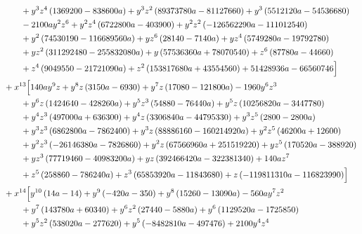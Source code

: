 \begin{align*}
&\qquad + y^{3} z^{4} \left(1369200 - 838600 a\right) + y^{3} z^{2} \left(89373780 a - 81127660\right) + y^{3} \left(5512120 a - 54536680\right)\\
&\qquad - 2100 a y^{2} z^{6} + y^{2} z^{4} \left(6722800 a - 403900\right) + y^{2} z^{2} \left(- 126562290 a - 111012540\right)\\
&\qquad + y^{2} \left(74530190 - 116689560 a\right) + y z^{6} \left(28140 - 7140 a\right) + y z^{4} \left(5749280 a - 19792780\right)\\
&\qquad + y z^{2} \left(311292480 - 255832080 a\right) + y \left(57536360 a + 78070540\right) + z^{6} \left(87780 a - 44660\right)\\
&\qquad + z^{4} \left(9049550 - 21721090 a\right) + z^{2} \left(153817680 a + 43554560\right) + 51428936 a - 66560746\Bigr]\\
&{}+x^{13}\Bigl[140 a y^{9} z + y^{8} z \left(3150 a - 6930\right) + y^{7} z \left(17080 - 121800 a\right) - 1960 y^{6} z^{3}\\
&\qquad + y^{6} z \left(1424640 - 428260 a\right) + y^{5} z^{3} \left(54880 - 76440 a\right) + y^{5} z \left(10256820 a - 3447780\right)\\
&\qquad + y^{4} z^{3} \left(497000 a + 636300\right) + y^{4} z \left(3306840 a - 44795330\right) + y^{3} z^{5} \left(2800 - 2800 a\right)\\
&\qquad + y^{3} z^{3} \left(6862800 a - 7862400\right) + y^{3} z \left(88886160 - 160214920 a\right) + y^{2} z^{5} \left(46200 a + 12600\right)\\
&\qquad + y^{2} z^{3} \left(- 26146380 a - 7826860\right) + y^{2} z \left(67566960 a + 251519220\right) + y z^{5} \left(170520 a - 388920\right)\\
&\qquad + y z^{3} \left(77719460 - 40983200 a\right) + y z \left(392466420 a - 322381340\right) + 140 a z^{7}\\
&\qquad + z^{5} \left(258860 - 786240 a\right) + z^{3} \left(65853920 a - 11843680\right) + z \left(- 119811310 a - 116823990\right)\Bigr]\\
&{}+x^{14}\Bigl[y^{10} \left(14 a - 14\right) + y^{9} \left(- 420 a - 350\right) + y^{8} \left(15260 - 13090 a\right) - 560 a y^{7} z^{2}\\
&\qquad + y^{7} \left(143780 a + 60340\right) + y^{6} z^{2} \left(27440 - 5880 a\right) + y^{6} \left(1129520 a - 1725850\right)\\
&\qquad + y^{5} z^{2} \left(538020 a - 277620\right) + y^{5} \left(- 8482810 a - 497476\right) + 2100 y^{4} z^{4}\\

\end{align*}
